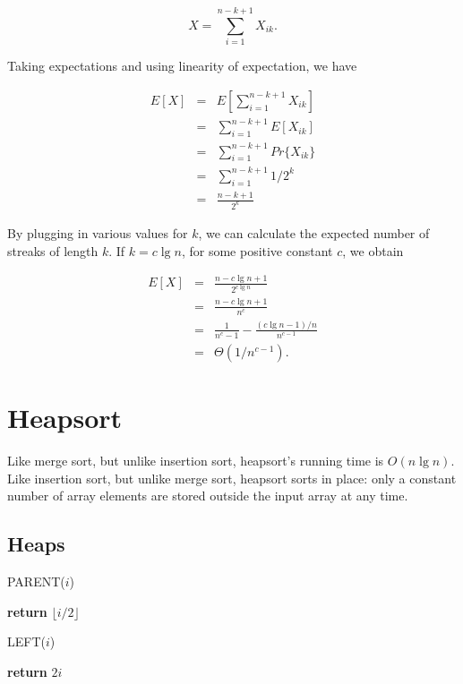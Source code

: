 \documentclass[12pt]{article}
\begin{document}
\begin{equation*}
  X = \sum_{i=1}^{n-k+1} X_{ik}.
\end{equation*}

Taking expectations and using linearity of expectation, we have

\begin{eqnarray*}
  E[X]
  &=& E \left[ \sum_{i=1}^{n-k+1} X_{ik} \right] \\
  &=& \sum_{i=1}^{n-k+1} E[X_{ik}] \\
  &=& \sum_{i=1}^{n-k+1} Pr \{ X_{ik} \} \\
  &=& \sum_{i=1}^{n-k+1} 1 / 2^k \\
  &=& \frac {n-k+1}{2^k}
\end{eqnarray*}

By plugging in various values for $k$, we can calculate the expected number of streaks of length $k$. If $k = c \lg n$, for some positive constant $c$, we obtain

\begin{eqnarray*}
  E[X]
  &=& \frac {n - c \lg n + 1}{2^{c \lg n}} \\
  &=& \frac {n - c \lg n + 1}{n^c} \\
  &=& \frac {1}{n^c - 1} - \frac {(c \lg n - 1)/n}{n^{c-1}} \\
  &=& \Theta(1 / n^{c-1}).
\end{eqnarray*}

\section{Heapsort}

Like merge sort, but unlike insertion sort, heapsort's running time is $O(n \lg n)$. Like insertion sort, but unlike merge sort, heapsort sorts in place: only a constant number of array elements are stored outside the input array at any time.

\subsection{Heaps}

PARENT($i$)
\begin{algorithmic}[1]
\State \textbf {return} $\lfloor i/2 \rfloor$
\end{algorithmic}

LEFT($i$)
\begin{algorithmic}[1]
\State \textbf {return} $2i$
\end{algorithmic}
\end{document}
